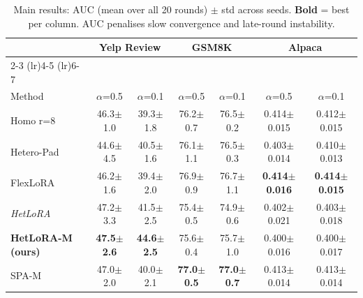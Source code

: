 \begin{table}[t]
  \centering
  \caption{Main results: AUC (mean over all 20 rounds) $\pm$ std across seeds.
    \textbf{Bold} = best per column. AUC penalises slow convergence and late-round instability.}
  \label{tab:main}
  \begin{tabular}{lcccccc}
    \toprule
      & \multicolumn{2}{c}{Yelp Review} & \multicolumn{2}{c}{GSM8K} & \multicolumn{2}{c}{Alpaca} \\
    \cmidrule(lr){2-3} \cmidrule(lr){4-5} \cmidrule(lr){6-7} \\
    Method & $\alpha$=0.5 & $\alpha$=0.1 & $\alpha$=0.5 & $\alpha$=0.1 & $\alpha$=0.5 & $\alpha$=0.1 \\
    \midrule
    Homo r=8 & 46.3\tiny{$\pm$1.0} & 39.3\tiny{$\pm$1.8} & 76.2\tiny{$\pm$0.7} & 76.5\tiny{$\pm$0.2} & 0.414\tiny{$\pm$0.015} & 0.412\tiny{$\pm$0.015} \\
    Hetero-Pad & 44.6\tiny{$\pm$4.5} & 40.5\tiny{$\pm$1.6} & 76.1\tiny{$\pm$1.1} & 76.5\tiny{$\pm$0.3} & 0.403\tiny{$\pm$0.014} & 0.410\tiny{$\pm$0.013} \\
    FlexLoRA & 46.2\tiny{$\pm$1.6} & 39.4\tiny{$\pm$2.0} & 76.9\tiny{$\pm$0.9} & 76.7\tiny{$\pm$1.1} & \textbf{0.414\tiny{$\pm$0.016}} & \textbf{0.414\tiny{$\pm$0.015}} \\
    \textit{HetLoRA} & 47.2\tiny{$\pm$3.3} & 41.5\tiny{$\pm$2.5} & 75.4\tiny{$\pm$0.5} & 74.9\tiny{$\pm$0.6} & 0.402\tiny{$\pm$0.021} & 0.403\tiny{$\pm$0.018} \\
    \textbf{HetLoRA-M (ours)} & \textbf{47.5\tiny{$\pm$2.6}} & \textbf{44.6\tiny{$\pm$2.5}} & 75.6\tiny{$\pm$0.4} & 75.7\tiny{$\pm$1.0} & 0.400\tiny{$\pm$0.016} & 0.400\tiny{$\pm$0.017} \\
    SPA-M & 47.0\tiny{$\pm$2.0} & 40.0\tiny{$\pm$2.1} & \textbf{77.0\tiny{$\pm$0.5}} & \textbf{77.0\tiny{$\pm$0.7}} & 0.413\tiny{$\pm$0.014} & 0.413\tiny{$\pm$0.014} \\
    \bottomrule
  \end{tabular}
\end{table}